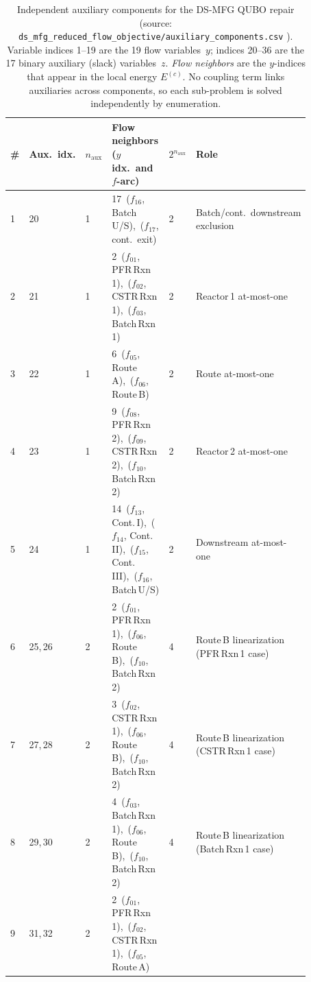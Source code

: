 \documentclass[10pt,letterpaper]{article}
\DeclareRobustCommand{\artifact}[1]{%
  {\begingroup\urlstyle{tt}\footnotesize\nolinkurl{#1}\endgroup}%
}
\begin{document}
\begin{table}[t]
\centering
\footnotesize
\caption{Independent auxiliary components for the DS-MFG QUBO repair (source: \artifact{ds\_mfg\_reduced\_flow\_objective/auxiliary\_components.csv}).
         Variable indices 1--19 are the 19 flow variables~$y$; indices 20--36 are the 17 binary auxiliary (slack) variables~$z$.
         \emph{Flow neighbors} are the $y$-indices that appear in the local energy $E^{(c)}$.
         No coupling term links auxiliaries across components, so each sub-problem is solved independently by enumeration.}
\label{tab:supp-aux-components}
\setlength{\tabcolsep}{3pt}
\begin{tabular}{L{0.04\linewidth}L{0.08\linewidth}L{0.05\linewidth}L{0.47\linewidth}L{0.05\linewidth}L{0.18\linewidth}}
\hline
\# & Aux.\ idx. & $n_{\mathrm{aux}}$ & Flow neighbors ($y$ idx.\ and $f$-arc) & $2^{n_{\mathrm{aux}}}$ & Role \\
  & 20      & 1 & 17~($f_{16}$, Batch\,U/S),~($f_{17}$, cont.\ exit)
   & 2 & Batch/cont.\ downstream exclusion \\
2  & 21      & 1 & 2~($f_{01}$, PFR\,Rxn\,1),~($f_{02}$, CSTR\,Rxn\,1),~($f_{03}$, Batch\,Rxn\,1)
   & 2 & Reactor\,1 at-most-one \\
3  & 22      & 1 & 6~($f_{05}$, Route\,A),~($f_{06}$, Route\,B)
   & 2 & Route at-most-one \\
4  & 23      & 1 & 9~($f_{08}$, PFR\,Rxn\,2),~($f_{09}$, CSTR\,Rxn\,2),~($f_{10}$, Batch\,Rxn\,2)
   & 2 & Reactor\,2 at-most-one \\
5  & 24      & 1 & 14~($f_{13}$, Cont.\,I),~($f_{14}$, Cont.\,II),~($f_{15}$, Cont.\,III),~($f_{16}$, Batch\,U/S)
   & 2 & Downstream at-most-one \\
6  & 25,\,26 & 2 & 2~($f_{01}$, PFR\,Rxn\,1),~($f_{06}$, Route\,B),~($f_{10}$, Batch\,Rxn\,2)
   & 4 & Route\,B linearization (PFR\,Rxn\,1 case) \\
7  & 27,\,28 & 2 & 3~($f_{02}$, CSTR\,Rxn\,1),~($f_{06}$, Route\,B),~($f_{10}$, Batch\,Rxn\,2)
   & 4 & Route\,B linearization (CSTR\,Rxn\,1 case) \\
8  & 29,\,30 & 2 & 4~($f_{03}$, Batch\,Rxn\,1),~($f_{06}$, Route\,B),~($f_{10}$, Batch\,Rxn\,2)
   & 4 & Route\,B linearization (Batch\,Rxn\,1 case) \\
9  & 31,\,32 & 2 & 2~($f_{01}$, PFR\,Rxn\,1),~($f_{02}$, CSTR\,Rxn\,1),~($f_{05}$, Route\,A)

\end{tabular}
\end{table}
\end{document}
